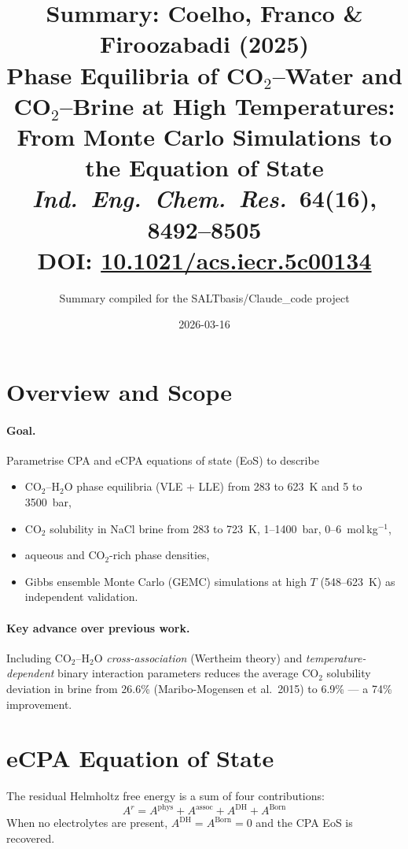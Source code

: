 \documentclass[11pt]{article}
\title{\textbf{Summary: Coelho, Franco \& Firoozabadi (2025)}\\[4pt]
\large Phase Equilibria of CO$_2$--Water and CO$_2$--Brine at High Temperatures:\\
From Monte Carlo Simulations to the Equation of State\\[4pt]
\normalsize \textit{Ind.\ Eng.\ Chem.\ Res.}\ \textbf{64}(16), 8492--8505\\
DOI: \href{https://doi.org/10.1021/acs.iecr.5c00134}{10.1021/acs.iecr.5c00134}}
\author{Summary compiled for the SALTbasis/Claude\_code project}
\date{2026-03-16}
\begin{document}
\maketitle
\tableofcontents

\section{Overview and Scope}

\paragraph{Goal.} Parametrise CPA and eCPA equations of state (EoS) to describe
\begin{itemize}
  \item CO$_2$--H$_2$O phase equilibria (VLE + LLE) from 283 to 623~K and 5 to 3500~bar,
  \item CO$_2$ solubility in NaCl brine from 283 to 723~K, 1--1400~bar, 0--6~mol\,kg$^{-1}$,
  \item aqueous and CO$_2$-rich phase densities,
  \item Gibbs ensemble Monte Carlo (GEMC) simulations at high $T$ (548--623~K) as independent validation.
\end{itemize}

\paragraph{Key advance over previous work.} Including CO$_2$--H$_2$O \emph{cross-association}
(Wertheim theory) and \emph{temperature-dependent} binary interaction parameters reduces the
average CO$_2$ solubility deviation in brine from 26.6\% (Maribo-Mogensen et al.\ 2015)
to 6.9\% --- a 74\% improvement.

\section{eCPA Equation of State}

The residual Helmholtz free energy is a sum of four contributions:
\begin{equation}
  A^r = A^{\text{phys}} + A^{\text{assoc}} + A^{\text{DH}} + A^{\text{Born}}
  \label{eq:Ar}
\end{equation}
When no electrolytes are present, $A^{\text{DH}} = A^{\text{Born}} = 0$ and the CPA EoS
is recovered.
\end{document}
